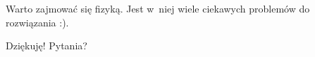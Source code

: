 \documentclass[10pt,t]{beamer}
\begin{document}








\begin{frame}[standout]


  { \color{jFrametitleFGColor} Warto zajmować się fizyką. Jest w~niej
    wiele ciekawych problemów do rozwiązania :). }

  \vspace{5em}



  { \Large \color{jFrametitleFGColor} Dziękuję! Pytania? }

\end{frame}
\end{document}
